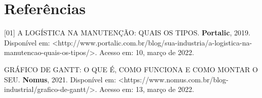 \documentclass[%
  a4paper,%
  12pt,%
  english,%
  brazilian,%
]{article}
\begin{document}
\section{Referências}%
[01] A LOGÍSTICA NA MANUTENÇÃO: QUAIS OS TIPOS. \textbf{Portalic}, 2019. Disponível em: <http://www.portalic.com.br/blog/sua-industria/a-logistica-na-manutencao-quais-os-tipos/>. Acesso em: 10, março de 2022.\par
[02] GRÁFICO DE GANTT: O QUE É, COMO FUNCIONA E COMO MONTAR O SEU. \textbf{Nomus}, 2021. Disponível em: <https://www.nomus.com.br/blog-industrial/grafico-de-gantt/>. Acesso em: 13, março de 2022.

\end{document}
